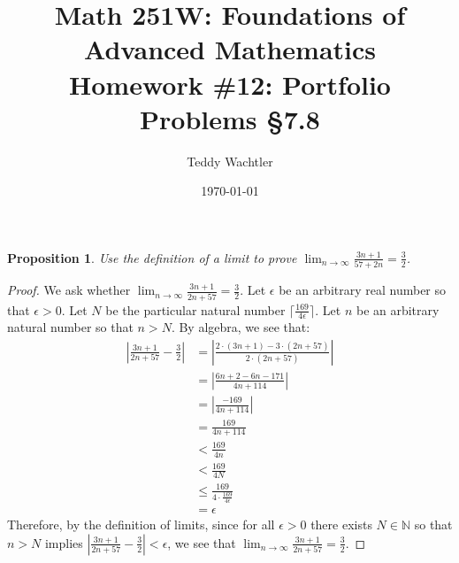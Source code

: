 \documentclass{amsart}
\newtheorem*{proposition}{Proposition}
\newcommand{\limn}{\displaystyle \lim_{n \rightarrow \infty}}
\newcommand{\abs}[1]{\left|#1\right|}
\newcommand{\ceil}[1]{\lceil #1 \rceil}
\newcommand{\N}{\mathbb{N}}
\numberwithin{equation}{section}
\begin{document}
	\title[Math 251W: Homework \#12]{
		Math 251W: Foundations of Advanced Mathematics \\
		\textmd{Homework \#12: Portfolio Problems \S 7.8}}
	\author{Teddy Wachtler}
	\date{\today}

	\maketitle

	\begin{problem}[manual-num=70]
		\begin{proposition}
			Use the definition of a limit to prove $\limn \frac{3n + 1}{57 + 2n} = \frac{3}{2}$.
		\end{proposition}

		\begin{proof}
			We ask whether $\limn \frac{3n + 1}{2n + 57} = \frac{3}{2}$.
			Let $\epsilon$ be an arbitrary real number so that $\epsilon > 0$.
			Let $N$ be the particular natural number $\ceil{\frac{169}{4 \epsilon}}$.
			Let $n$ be an arbitrary natural number so that $n > N$.
			By algebra, we see that:
			\begin{align*}
				\abs{\frac{3n + 1}{2n + 57} - \frac{3}{2}}
				&= \abs{\frac{2 \cdot (3n + 1) - 3 \cdot (2n + 57)}{2 \cdot (2n + 57)}} \\
				&= \abs{\frac{6n + 2 - 6n - 171}{4n + 114}} \\
				&= \abs{\frac{-169}{4n + 114}} \\
				&= \frac{169}{4n + 114} \\
				&< \frac{169}{4n} \\
				&< \frac{169}{4N} \\
				&\leq \frac{169}{4 \cdot \frac{169}{4 \epsilon}} \\
				&= \epsilon
			\end{align*}
			Therefore, by the definition of limits, since for all $\epsilon > 0$ there exists $N \in \N$ so that $n > N$ implies $\abs{\frac{3n + 1}{2n + 57} - \frac{3}{2}} < \epsilon$, we see that $\limn \frac{3n + 1}{2n + 57} = \frac{3}{2}$.
		\end{proof}
	\end{problem}
\end{document}

